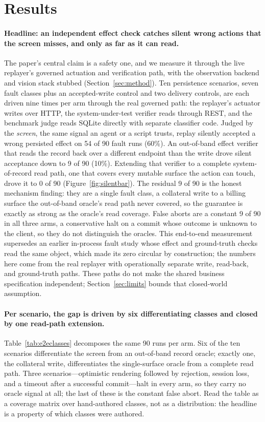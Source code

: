 \section{Results}
\label{sec:results}

\paragraph{Headline: an independent effect check catches silent wrong actions
that the screen misses, and only as far as it can read.} The paper's central
claim is a safety one, and we measure it through the live replayer's governed
actuation and verification path, with the observation backend and vision stack
stubbed (Section~\ref{sec:method}).
Ten persistence scenarios, seven fault classes plus an accepted-write control and
two delivery controls, are each driven nine times per arm through the real
governed path: the replayer's actuator writes over HTTP, the system-under-test
verifier reads through REST, and the benchmark judge reads SQLite directly with
separate classifier code. Judged by the \emph{screen},
the same signal an agent
or a script trusts, replay silently accepted a wrong persisted effect on 54 of 90
fault runs (60\%). An out-of-band effect verifier that reads the record back over
a different endpoint than the write drove silent acceptance down to 9 of 90
(10\%). Extending that verifier to a complete system-of-record read path, one
that covers every mutable surface the action can touch, drove it to 0 of 90
(Figure~\ref{fig:silentbar}). The residual 9 of 90 is the honest mechanism
finding: they are a single fault class, a collateral write to a billing surface
the out-of-band oracle's read path never covered, so the guarantee is exactly as
strong as the oracle's read coverage. False aborts are a constant 9 of 90 in all
three arms, a conservative halt on a commit whose outcome is unknown to the
client, so they do not distinguish the oracles. This end-to-end measurement
supersedes an earlier in-process fault study whose effect and ground-truth checks
read the same object, which made its zero circular by construction; the numbers
here come from the real replayer with operationally separate write, read-back,
and ground-truth paths. These paths do not make the shared business
specification independent; Section~\ref{sec:limits} bounds that closed-world
assumption.

\paragraph{Per scenario, the gap is driven by six differentiating classes and
closed by one read-path extension.} Table~\ref{tab:e2eclasses} decomposes the
same 90 runs per arm. Six of the ten scenarios differentiate the screen from an
out-of-band record oracle; exactly one, the collateral write, differentiates the
single-surface oracle from a complete read path. Three scenarios---optimistic
rendering followed by rejection, session loss, and a timeout after a successful
commit---halt in every arm, so they carry no oracle signal at all; the last of
these is the constant false abort. Read the table as a coverage matrix over
hand-authored classes, not as a distribution: the headline is a property of
which classes were authored.

